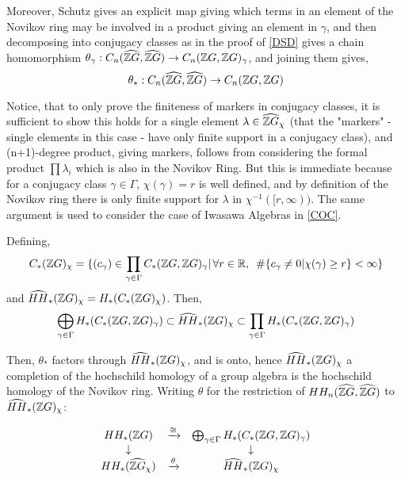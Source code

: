 Moreover, Schutz gives an explicit map giving which terms in an element of the Novikov ring may be involved in a product giving an element in $\gamma$, and then decomposing into conjugacy classes as in the proof of \ref{DSD} gives a chain homomorphism $\theta_\gamma: C_n(\widehat{\mathbb Z G},\widehat{\mathbb Z G})\rightarrow C_n(\mathbb Z G, \mathbb Z G)_\gamma$, and joining them gives,
$$\theta_*: C_n(\widehat{\mathbb Z G},\widehat{\mathbb Z G})\rightarrow C_n(\mathbb Z G, \mathbb Z G)$$

Notice, that to only prove the finiteness of markers in conjugacy classes, it is sufficient to show this holds for a single element $\lambda\in \widehat{\mathbb Z G}_\chi$ (that the "markers" - single elements in this case - have only finite support in a conjugacy class), and (n+1)-degree product, giving markers, follows from considering the formal product $\prod \lambda_i$ which is also in the Novikov Ring. But this is immediate because for a conjugacy class $\gamma\in\Gamma$,  $\chi(\gamma) = r$ is well defined, and by definition of the Novikov ring there is only finite support for $\lambda$ in $\chi^{-1} ([r,\infty))$. The same argument is used to consider the case of Iwasawa Algebras in \ref{COC}.

Defining,
$$C_*(\mathbb Z G)_\chi = \{(c_\gamma)\in \prod_{\gamma\in \Gamma} C_*(\mathbb Z G, \mathbb Z G)_\gamma |\,\forall r\in \mathbb R,\,\,\, \#\{c_\gamma\neq 0|\chi(\gamma)\geq r\}<\infty\}$$
and $\widehat{HH}_*(\mathbb Z G)_\chi = H_*(C_*(\mathbb Z G)_\chi)$. Then,
$$\bigoplus_{\gamma\in \Gamma} H_*(C_*(\mathbb Z G, \mathbb Z G)_\gamma)\subset \widehat{HH}_*(\mathbb Z G)_\chi \subset\prod_{\gamma\in \Gamma} H_*(C_*(\mathbb Z G, \mathbb Z G)_\gamma)$$

Then, $\theta_*$ factors through $\widehat{HH}_*(\mathbb Z G)_\chi$, and is onto, hence $\widehat{HH}_*(\mathbb Z G)_\chi$ a completion of the hochschild homology of a group algebra is the hochschild homology of the Novikov ring. Writing $\theta$ for the restriction of $HH_n(\widehat{\mathbb Z G},\widehat{\mathbb Z G})$ to $\widehat{HH}_*(\mathbb Z G)_\chi$:

$$\begin{array}{ccc}
 HH_*(\mathbb Z G)  &  \xrightarrow{\cong} & \bigoplus_{\gamma\in \Gamma} H_*(C_*(\mathbb Z G, \mathbb Z G)_\gamma) \\
 \downarrow  &&  \downarrow \\
 HH_*(\widehat{\mathbb Z G}_\chi )& \xrightarrow{\theta}& \widehat{HH}_*(\mathbb Z G)_\chi \\\end{array}$$

